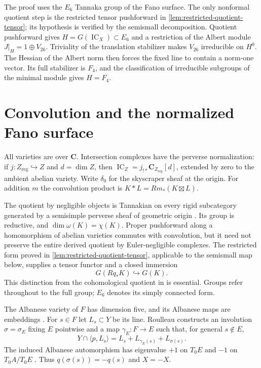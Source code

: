 \documentclass[10pt]{amsart}
\numberwithin{equation}{section}
\theoremstyle{remark}
\newcommand{\CC}{\mathbf C}
\newcommand{\IC}{\operatorname{IC}}
\newcommand{\reg}{\mathrm{reg}}
\begin{document}
The proof uses the $E_6$ Tannaka group of the Fano surface.
The only nonformal quotient step is the restricted tensor
pushforward in \cref{lem:restricted-quotient-tensor};
its hypothesis is verified by the semismall decomposition.  Quotient
pushforward gives $H=G(\IC_X)\subset E_6$ and a restriction of the Albert
module $J|_H=1\oplus V_{26}$.  Triviality of the translation stabilizer
makes $V_{26}$ irreducible on $H^0$.  The Hessian of the Albert norm then
forces the fixed line to contain a norm-one vector.  Its full stabilizer
is $F_4$, and the classification of irreducible subgroups of the minimal
module gives $H=F_4$.

\section{Convolution and the normalized Fano surface}

All varieties are over $\CC$.  Intersection complexes have the perverse
normalization: if $j:Z_{\reg}\hookrightarrow Z$ and $d=\dim Z$, then
$\IC_Z=j_{!*}\CC_{Z_{\reg}}[d]$, extended by zero to the ambient abelian
variety.  Write $\delta_0$ for the skyscraper sheaf at the origin.  For
addition $m$ the convolution product is $K*L=Rm_*(K\boxtimes L)$.

The quotient by negligible objects is Tannakian on every rigid
subcategory generated by a semisimple perverse sheaf of geometric origin
\cite{KW2015,JKLM2025}.  Its group is reductive, and
$\dim\omega(K)=\chi(K)$.  Proper pushforward along a homomorphism of abelian varieties commutes
with convolution, but it need not preserve the entire derived quotient
by Euler-negligible complexes. The restricted form proved in
\cref{lem:restricted-quotient-tensor}, applicable to the semismall map
below, supplies a tensor functor and a closed immersion
\begin{equation}\label{eq:quotient-tensor}
 G(Rq_*K)\hookrightarrow G(K).
\end{equation}
This distinction from the cohomological quotient in
\cite[Lemma~13.7]{KW2015} is essential.  Groups refer throughout to the full group;
$E_6$ denotes its simply connected form.

The Albanese variety of $F$ has dimension five, and its Albanese maps
are embeddings \cite{CG1972}.  For $s\in F$ let $L_s\subset Y$ be its line.
Roulleau constructs an involution $\sigma=\sigma_E$ fixing $E$ pointwise
and a map $\gamma_E:F\to E$ such that, for general $s\notin E$,
\begin{equation}\label{eq:plane-section}
 Y\cap\langle p,L_s\rangle=L_s+L_{\gamma_E(s)}+L_{\sigma(s)}.
\end{equation}
The induced Albanese automorphism has eigenvalue $+1$ on $T_0E$ and
$-1$ on $T_0A/T_0E$ \cite[Section~3.1 and Theorem~13]{Roulleau2009}.
Thus $q(\sigma(s))=-q(s)$ and $X=-X$.
\end{document}
